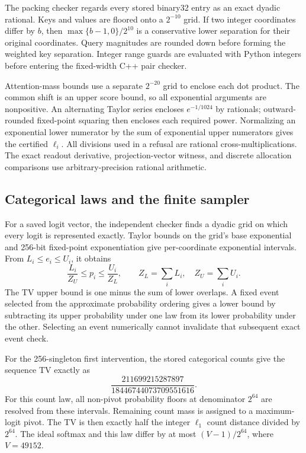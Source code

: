 \documentclass[10pt]{article}
\theoremstyle{definition}\newtheorem{definition}[theorem]{Definition}
\begin{document}
The packing checker regards every stored binary32 entry as an exact dyadic rational. Keys and values are floored onto a $2^{-10}$ grid. If two integer coordinates differ by $b$, then $\max\{b-1,0\}/2^{10}$ is a conservative lower separation for their original coordinates. Query magnitudes are rounded down before forming the weighted key separation. Integer range guards are evaluated with Python integers before entering the fixed-width C++ pair checker.

Attention-mass bounds use a separate $2^{-20}$ grid to enclose each dot product. The common shift is an upper score bound, so all exponential arguments are nonpositive. An alternating Taylor series encloses $e^{-1/1024}$ by rationals; outward-rounded fixed-point squaring then encloses each required power. Normalizing an exponential lower numerator by the sum of exponential upper numerators gives the certified $\ell_i$. All divisions used in a refusal are rational cross-multiplications. The exact readout derivative, projection-vector witness, and discrete allocation comparisons use arbitrary-precision rational arithmetic.

\subsection{Categorical laws and the finite sampler}
\label{app:sampler}
For a saved logit vector, the independent checker finds a dyadic grid on which every logit is represented exactly. Taylor bounds on the grid's base exponential and 256-bit fixed-point exponentiation give per-coordinate exponential intervals. From $L_i\leq e_i\leq U_i$, it obtains
\[
 \frac{L_i}{Z_U}\leq p_i\leq\frac{U_i}{Z_L},\qquad
 Z_L=\sum_iL_i,\quad Z_U=\sum_iU_i.
\]
The TV upper bound is one minus the sum of lower overlaps. A fixed event selected from the approximate probability ordering gives a lower bound by subtracting its upper probability under one law from its lower probability under the other. Selecting an event numerically cannot invalidate that subsequent exact event check.

For the 256-singleton first intervention, the stored categorical counts give the sequence TV exactly as
\begin{equation}\label{eq:exacttv}
       \frac{211699215287897}{18446744073709551616}.
\end{equation}
For this count law, all non-pivot probability floors at denominator $2^{64}$ are resolved from these intervals. Remaining count mass is assigned to a maximum-logit pivot. The TV is then exactly half the integer $\ell_1$ count distance divided by $2^{64}$. The ideal softmax and this law differ by at most $(V-1)/2^{64}$, where $V=49152$.
\end{document}
